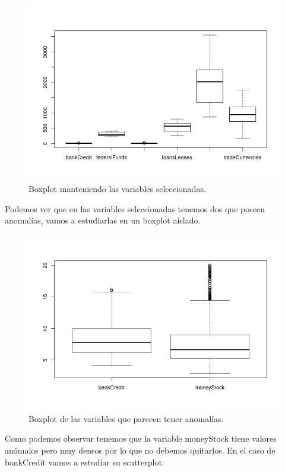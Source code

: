 \documentclass[12pt,a4paper]{article}
\begin{document}
\begin{figure}[H]
	\centering
	\includegraphics[scale=0.8]{./Imagenes/EDA/Regresion/boxplot_filtrado3.png}
	\caption{Boxplot manteniendo las variables seleccionadas.}
\end{figure}

Podemos ver que en las variables seleccionadas tenemos dos que poseen anomalías, vamos a estudiarlas en un boxplot aislado.

\begin{figure}[H]
	\centering
	\includegraphics[scale=0.8]{./Imagenes/EDA/Regresion/boxplot_filtrado4.png}
	\caption{Boxplot de las variables que parecen tener anomalías.}
\end{figure}

Como podemos observar tenemos que la variable moneyStock tiene valores anómalos pero muy densos por lo que no debemos quitarlos. En el caso de bankCredit vamos a estudiar su scatterplot.
\end{document}
